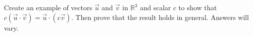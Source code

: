 {Create an example of vectors $\vec u$ and $\vec v$  in $\mathbb{R}^3$  and scalar $c$ to show that $c(\vec u\cdot \vec v) = \vec u\cdot (c\vec v)$. Then prove that the result holds in general.
}
{Answers will vary.
}
